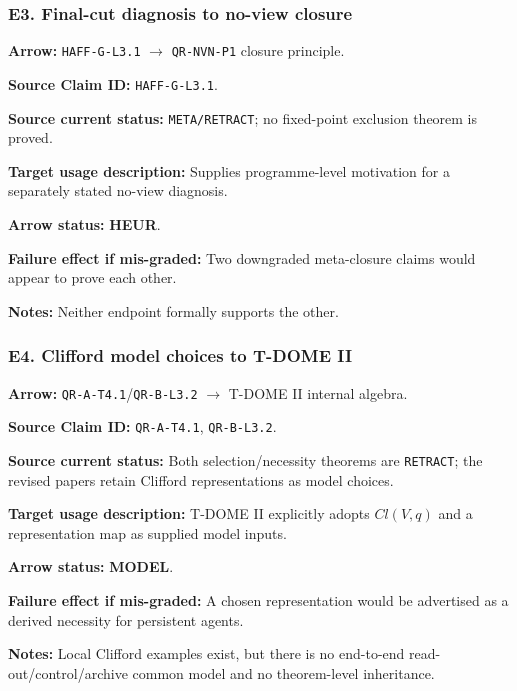\documentclass[12pt,a4paper]{article}
\begin{document}
\subsubsection*{E3. Final-cut diagnosis to no-view closure}
\noindent\textbf{Arrow:} \texttt{HAFF-G-L3.1}
\(\to\) \texttt{QR-NVN-P1} closure principle.\par
\noindent\textbf{Source Claim ID:} \texttt{HAFF-G-L3.1}.\par
\noindent\textbf{Source current status:} \texttt{META/RETRACT}; no
fixed-point exclusion theorem is proved.\par
\noindent\textbf{Target usage description:} Supplies programme-level
motivation for a separately stated no-view diagnosis.\par
\noindent\textbf{Arrow status:} \textbf{HEUR}.\par
\noindent\textbf{Failure effect if mis-graded:} Two downgraded
meta-closure claims would appear to prove each other.\par
\noindent\textbf{Notes:} Neither endpoint formally supports the other.\par

\subsubsection*{E4. Clifford model choices to T-DOME II}
\noindent\textbf{Arrow:} \texttt{QR-A-T4.1}/\texttt{QR-B-L3.2}
\(\to\) T-DOME II internal algebra.\par
\noindent\textbf{Source Claim ID:} \texttt{QR-A-T4.1},
\texttt{QR-B-L3.2}.\par
\noindent\textbf{Source current status:} Both selection/necessity
theorems are \texttt{RETRACT}; the revised papers retain Clifford
representations as model choices.\par
\noindent\textbf{Target usage description:} T-DOME II explicitly adopts
\(Cl(V,q)\) and a representation map as supplied model inputs.\par
\noindent\textbf{Arrow status:} \textbf{MODEL}.\par
\noindent\textbf{Failure effect if mis-graded:} A chosen representation
would be advertised as a derived necessity for persistent agents.\par
\noindent\textbf{Notes:} Local Clifford examples exist, but there is no
end-to-end read-out/control/archive common model and no theorem-level
inheritance.\par
\end{document}
